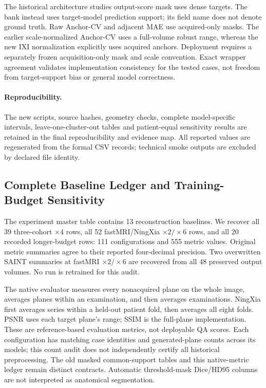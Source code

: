 The historical architecture studies output-score mask uses dense targets. The bank instead uses target-model prediction support; its field name does not denote ground truth. Raw Anchor-CV and adjacent MAE use acquired-only masks. The earlier scale-normalized Anchor-CV uses a full-volume robust range, whereas the new IXI normalization explicitly uses acquired anchors. Deployment requires a separately frozen acquisition-only mask and scale convention. Exact wrapper agreement validates implementation consistency for the tested cases, not freedom from target-support bias or general model correctness.

\paragraph{Reproducibility.}
The new scripts, source hashes, geometry checks, complete model-specific intervals, leave-one-cluster-out tables and patient-equal sensitivity results are retained in the final reproducibility and evidence map. All reported values are regenerated from the formal CSV records; technical smoke outputs are excluded by declared file identity.


\subsection{Complete Baseline Ledger and Training-Budget Sensitivity}
The experiment master table contains 13 reconstruction baselines. We recover all 39 three-cohort $\times4$ rows, all 52 fastMRI/NingXia $\times2/\times6$ rows, and all 20 recorded longer-budget rows: 111 configurations and 555 metric values. Original metric summaries agree to their reported four-decimal precision. Two overwritten SAINT summaries at fastMRI $\times2/\times6$ are recovered from all 48 preserved output volumes. No run is retrained for this audit.

The native evaluator measures every nonacquired plane on the whole image, averages planes within an examination, and then averages examinations. NingXia first averages series within a held-out patient fold, then averages all eight folds. PSNR uses each target plane's range; SSIM is the full-plane implementation. These are reference-based evaluation metrics, not deployable QA scores. Each configuration has matching case identities and generated-plane counts across its models; this count audit does not independently certify all historical preprocessing. The old masked common-support tables and this native-metric ledger remain distinct contracts. Automatic threshold-mask Dice/HD95 columns are not interpreted as anatomical segmentation.

